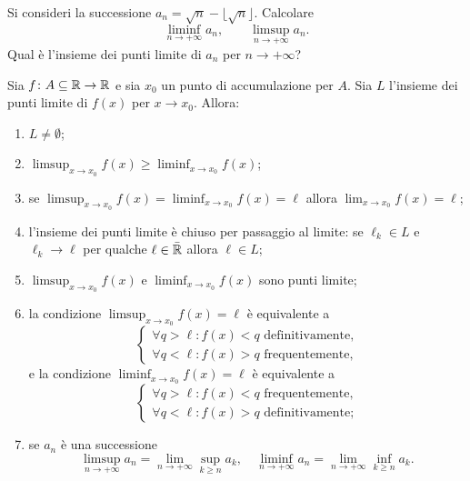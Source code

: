 \begin{exercise}
  Si consideri la successione $a_n = \sqrt n -\lfloor \sqrt n\rfloor$.
  Calcolare 
  \[
    \liminf_{n\to+\infty} a_n, \qquad 
    \limsup_{n\to+\infty} a_n.
  \]
  Qual è l'insieme dei punti limite di $a_n$ per $n\to +\infty$?
\end{exercise}

%
\begin{theorem}
Sia $f\colon A\subseteq {\mathbb R} \to {\mathbb R}$ e sia $x_0$ un punto di accumulazione per $A$.
Sia $L$ l'insieme dei punti limite di $f(x)$ per $x\to x_0$. 
Allora:
\begin{enumerate}
  \item %
  $L\neq \emptyset$;

  \item %
  $\displaystyle\limsup_{x\to x_0} f(x) \ge \liminf_{x\to x_0} f(x)$;

  \item %
  se $\displaystyle\limsup_{x\to x_0} f(x) = \liminf_{x\to x_0} f(x) = \ell$ 
  allora $\displaystyle\lim_{x\to x_0} f(x) = \ell$;

  \item %
  l'insieme dei punti limite è chiuso per passaggio al limite:
  se $\ell_k\in L$ e $\ell_k \to \ell$ per qualche $\ell \in \bar {{\mathbb R}}$ 
  allora $\ell \in L$;

  \item %
  $\displaystyle\limsup_{x\to x_0} f(x)$ e $\displaystyle\liminf_{x\to x_0} f(x)$ sono punti limite;

  \item %
  la condizione
  $\displaystyle\limsup_{x\to x_0} f(x) = \ell$ è equivalente a
  \[
  \begin{cases}
   \forall q > \ell \colon f(x) < q \text{ definitivamente,} \\
   \forall q < \ell \colon f(x) > q \text{ frequentemente,}
  \end{cases}
  \]
  e la condizione $\displaystyle\liminf_{x\to x_0} f(x) = \ell$ è equivalente a
  \[
  \begin{cases}
  \forall q > \ell \colon f(x) < q \text{ frequentemente,} \\
  \forall q < \ell \colon f(x) > q \text{ definitivamente;}
  \end{cases}
  \]

  \item %
  se $a_n$ è una successione 
  \[
    \limsup_{n\to +\infty} a_n = \lim_{n\to +\infty} \sup_{k\ge n} a_k,
    \quad
    \liminf_{n\to +\infty} a_n = \lim_{n\to +\infty} \inf_{k\ge n} a_k.
  \]
 \end{enumerate}
\end{theorem}
